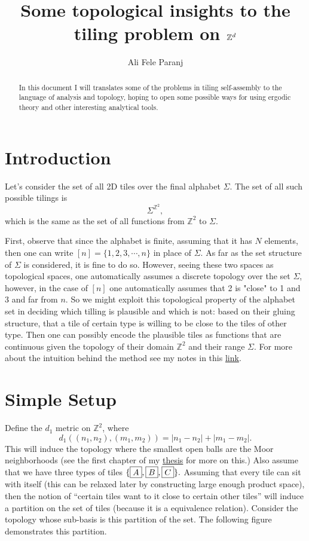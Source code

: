 \documentclass[11pt,a4paper]{article}
\title{Some topological insights to the tiling problem on $ \Z^d $}
\author{Ali Fele Paranj}
\newcommand{\Z}{\mathbb{Z}}
\newcommand{\tile}[1]{\fbox{\ensuremath{#1}}}
\theoremstyle{definition}
\theoremstyle{remark}
\theoremstyle{definition}
\begin{document}
	
	\maketitle
	\begin{abstract}
		In this document I will translates some of the problems in tiling self-assembly to the language of analysis and topology, hoping to open some possible ways for using ergodic theory and other interesting analytical tools. 
	\end{abstract}
	
	
	\section{Introduction}
	
	Let's consider the set of all 2D tiles over the final alphabet $\Sigma$. The set of all such possible tilings is 
	$$ \Sigma^{\mathbb{Z}^2}, $$
	which is the same as the set of all functions from $\mathbb{Z}^2$ to $\Sigma$. 
	
	First, observe that since the alphabet is finite, assuming that it has $N$ elements, then one can write $[n] = \{1,2,3,\cdots,n\}$ in place of $\Sigma$. As far as the set structure of $\Sigma$ is considered, it is fine to do so. However, seeing these two spaces as topological spaces, one automatically assumes a discrete topology over the set $\Sigma$, however, in the case of $[n]$ one automatically assumes that 2 is "close" to 1 and 3 and far from $n$. So we might exploit this topological property of the alphabet set in deciding which tilling is plausible and which is not: based on their gluing structure, that a tile of certain type is willing to be close to the tiles of other type. Then one can possibly encode the plausible tiles as functions that are continuous given the topology of their domain $\mathbb{Z}^2$ and their range $\Sigma$. For more about the intuition behind the method see my notes in this \href{https://github.com/alifele/Lecture-Notes/blob/main/Scientific%20Notes/Some%20Intuitions%20on%20Continuous%20Maps/GraphHomologyAndCohomology.pdf}{link}.
	
	
	\section{Simple Setup}
	Define the $ d_1 $ metric on $ \Z^2 $, where
	\[ d_1\left( (n_1,n_2), (m_1,m_2) \right) = |n_1-n_2| + |m_1-m_2|. \]
	This will induce the topology where the smallest open balls are the Moor neighborhoods (see the first chapter of my \href{https://open.library.ubc.ca/soa/cIRcle/collections/ubctheses/24/items/1.0449873}{thesis} for more on this.) Also assume that we have three types of tiles $ \{ \tile{A}, \tile{B}, \tile{C} \}. $ Assuming that every tile can sit with itself (this can be relaxed later by constructing large enough product space), then the notion of ``certain tiles want to it close to certain other tiles'' will induce a partition on the set of tiles (because it is a equivalence relation). Consider the topology whose sub-basis is this partition of the set. The following figure demonstrates this partition.
	
\end{document}
